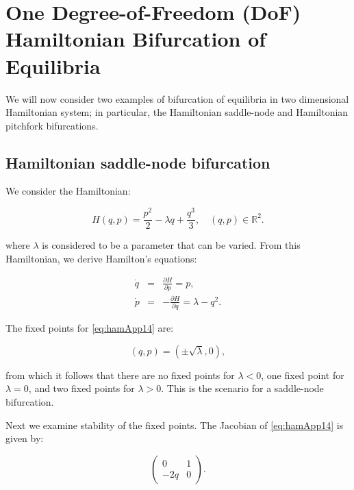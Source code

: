 \documentclass{article}
\begin{document}
\section*{One Degree-of-Freedom (DoF) Hamiltonian Bifurcation of Equilibria}

We will now consider two examples of bifurcation of equilibria in two dimensional Hamiltonian system; in particular, the Hamiltonian saddle-node and Hamiltonian pitchfork bifurcations.  

\subsection*{Hamiltonian saddle-node bifurcation}

We consider the Hamiltonian:

\begin{equation}
H (q, p) = \frac{p^2}{2} - \lambda q + \frac{q^3}{3}, \quad (q, p) \in \mathbb{R}^2.
\label{eq:hamApp13}
\end{equation}

\noindent
where $\lambda$ is considered to be a parameter that can be varied. From this Hamiltonian, we derive Hamilton's equations:

\begin{eqnarray}
\dot{q} & = & \frac{\partial H}{\partial p} = p, \nonumber \\
\dot{p} & = & -\frac{\partial H}{\partial q} =\lambda - q^2.
\label{eq:hamApp14}
\end{eqnarray}

\noindent
The fixed points for \eqref{eq:hamApp14} are:

\begin{equation}
(q, p) = (\pm\sqrt{\lambda}, 0),
\end{equation}

\noindent
from which it follows that there are no fixed points for $\lambda <0$, one fixed point for $\lambda =0$, and  two fixed points for $\lambda >0$. This is the scenario for a saddle-node bifurcation. 

Next we examine stability of the fixed points. The Jacobian of \eqref{eq:hamApp14} is given by:

\begin{equation}
\left(
\begin{array}{cc} 
0 & 1\\
-2 q & 0
\end{array}
\right).
\label{eq:hamApp15}
\end{equation}
\end{document}
